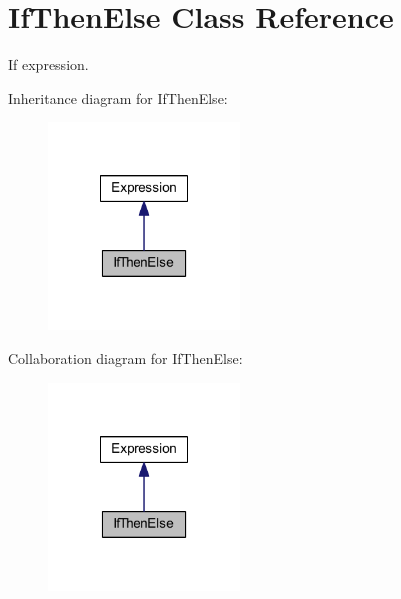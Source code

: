 \hypertarget{class_if_then_else}{\section{If\-Then\-Else Class Reference}
\label{class_if_then_else}
}


If expression.  




Inheritance diagram for If\-Then\-Else\-:\nopagebreak
\begin{figure}[H]
\begin{center}
\leavevmode
\includegraphics[width=144pt]{class_if_then_else__inherit__graph}
\end{center}
\end{figure}


Collaboration diagram for If\-Then\-Else\-:\nopagebreak
\begin{figure}[H]
\begin{center}
\leavevmode
\includegraphics[width=144pt]{class_if_then_else__coll__graph}
\end{center}
\end{figure}
